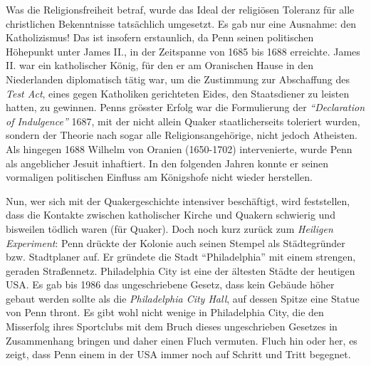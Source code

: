 \medskip

Was die Religionsfreiheit betraf, wurde das Ideal der religiösen Toleranz für
alle
christlichen Bekenntnisse tatsächlich umgesetzt. Es gab nur eine Ausnahme: den
Katholizismus! Das ist insofern erstaunlich, da Penn
seinen politischen Höhepunkt unter James II., in der Zeitspanne von 1685 bis 1688 erreichte. James II. war ein
katholischer König, für den er am Oranischen Hause in
den Niederlanden diplomatisch tätig war, um die Zustimmung zur
Abschaffung des \textit{Test Act}, eines gegen Katholiken gerichteten Eides,
den Staatsdiener zu leisten hatten, zu gewinnen. Penns grösster
Erfolg war die Formulierung
der \textit{"`Declaration of Indulgence"'} 1687, mit der nicht allein Quaker
staatlicherseits toleriert wurden, sondern der Theorie nach sogar alle
Religionsangehörige, nicht jedoch Atheisten. Als
hingegen 1688 Wilhelm von Oranien (1650-1702) intervenierte, wurde Penn als angeblicher
Jesuit inhaftiert. In den folgenden Jahren konnte er
seinen vormaligen politischen Einfluss am Königshofe nicht
wieder herstellen.



\medskip

Nun, wer sich mit der Quakergeschichte intensiver beschäftigt, wird feststellen,
dass die Kontakte zwischen katholischer Kirche und Quakern schwierig und
bisweilen tödlich waren (für Quaker). Doch noch kurz zurück zum \textit{Heiligen
Experiment}: Penn drückte der Kolonie auch seinen Stempel als Städtegründer
bzw. Stadtplaner auf. Er gründete die Stadt "`Philadelphia"' mit einem strengen, geraden
Straßennetz. Philadelphia City ist eine der ältesten Städte der heutigen USA. Es gab
bis 1986 das ungeschriebene Gesetz, dass kein Gebäude höher gebaut werden sollte
als die \textit{Philadelphia City Hall},
auf dessen Spitze eine Statue von Penn thront. Es gibt wohl nicht wenige in
Philadelphia City, die den Misserfolg ihres Sportclubs
mit dem Bruch dieses ungeschrieben Gesetzes in Zusammenhang bringen und daher einen Fluch vermuten.
Fluch hin oder her, es zeigt, dass Penn einem in der USA immer noch auf
Schritt und Tritt
begegnet.

